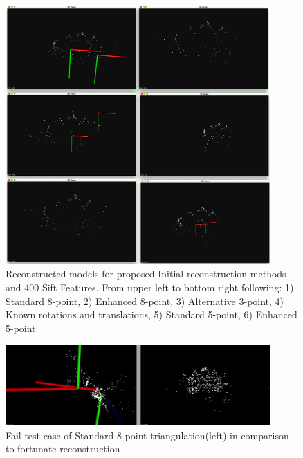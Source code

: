 \begin{figure}[t!]
    \centering
    \includegraphics[width=0.9\textwidth]{uni400Comparison}
    \caption{Reconstructed models for proposed Initial reconstruction methods and 400 Sift Features. From upper left to bottom right following: 1) Standard 8-point, 2) Enhanced 8-point, 3) Alternative 3-point, 4) Known rotations and translations, 5) Standard 5-point, 6) Enhanced 5-point}
    \label{fig:uni400Comparison}
\end{figure}
\begin{figure}[p]
    \centering
    \includegraphics[width=0.9\textwidth]{FailCaseFundamental}
    \caption{Fail test case of Standard 8-point triangulation(left) in comparison to fortunate reconstruction}
    \label{fig:FailCaseFundamental}
\end{figure}
